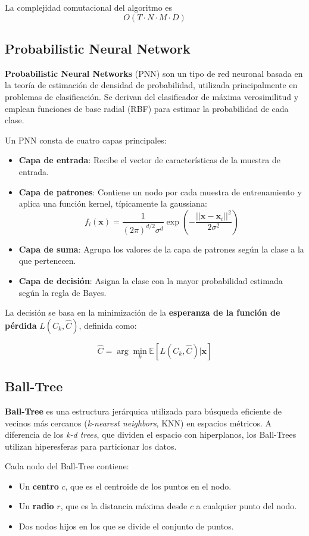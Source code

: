 \documentclass[titlepage,a4paper]{article}
\begin{document}
La complejidad comutacional del algoritmo es 
\[
O(T \cdot N \cdot M \cdot D)
\]
\subsection{Probabilistic Neural Network}
\textbf{Probabilistic Neural Networks} (PNN) son un tipo de red neuronal basada en la teoría de estimación de densidad de probabilidad, utilizada principalmente en problemas de clasificación. Se derivan del clasificador de máxima verosimilitud y emplean funciones de base radial (RBF) para estimar la probabilidad de cada clase.

Un PNN consta de cuatro capas principales:

\begin{itemize}
    \item \textbf{Capa de entrada}: Recibe el vector de características de la muestra de entrada.
    \item \textbf{Capa de patrones}: Contiene un nodo por cada muestra de entrenamiento y aplica una función kernel, típicamente la gaussiana:
    \[
    f_i(\mathbf{x}) = \frac{1}{(2\pi)^{d/2} \sigma^d} \exp\left(-\frac{||\mathbf{x} - \mathbf{x}_i||^2}{2\sigma^2}\right)
    \]
    \item \textbf{Capa de suma}: Agrupa los valores de la capa de patrones según la clase a la que pertenecen.
    \item \textbf{Capa de decisión}: Asigna la clase con la mayor probabilidad estimada según la regla de Bayes.
\end{itemize}


La decisión se basa en la minimización de la \textbf{esperanza de la función de pérdida} \( L(C_k, \hat{C}) \), definida como:

\[
\hat{C} = \arg\min_k \mathbb{E}[L(C_k, \hat{C}) | \mathbf{x}]
\]

\subsection{Ball-Tree}
\textbf{Ball-Tree} es una estructura jerárquica utilizada para búsqueda eficiente de vecinos más cercanos (\textit{k-nearest neighbors}, KNN) en espacios métricos. A diferencia de los \textit{k-d trees}, que dividen el espacio con hiperplanos, los Ball-Trees utilizan hiperesferas para particionar los datos.


Cada nodo del Ball-Tree contiene:
\begin{itemize}
    \item Un \textbf{centro} \( c \), que es el centroide de los puntos en el nodo.
    \item Un \textbf{radio} \( r \), que es la distancia máxima desde \( c \) a cualquier punto del nodo.
    \item Dos nodos hijos en los que se divide el conjunto de puntos.
\end{itemize}
\end{document}
